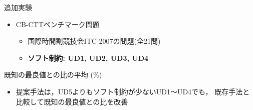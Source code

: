 \documentclass[11pt,dvipdfmx]{beamer}
\newcommand{\backupend}{
   \addtocounter{framenumberappendix}{-\value{framenumber}}
   \addtocounter{framenumber}{\value{framenumberappendix}} 
}
\begin{document}
\begin{frame}{追加実験}
  \begin{itemize}
  \item CB-CTTベンチマーク問題
    \begin{itemize}
    \item 国際時間割競技会ITC-2007の問題(全21問)
    \item \textbf{ソフト制約: UD1, UD2, UD3, UD4}
    \end{itemize}
  \end{itemize}
  \begin{exampleblock}{既知の最良値との比の平均 (\%)}
  \begin{center}
    \begin{tableE}
      
    \end{tableE}
  \end{center}
  \end{exampleblock}
  \begin{itemize}
  \item 提案手法は，UD5よりもソフト制約が少ないUD1〜UD4でも，
    既存手法と比較して既知の最良値との比を改善
  \end{itemize}
\end{frame}

\backupend
\end{document}
